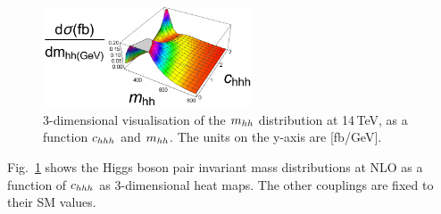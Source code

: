 \begin{figure}[ht]
\begin{center}
  \includegraphics[width=0.55\textwidth]{plots/3D_mhh_chhh.pdf}    
\end{center}
\caption{3-dimensional visualisation of the $m_{hh}$ distribution at
  14\,TeV, as a function  $c_{hhh}$ and $m_{hh}$. The units on the y-axis are [fb/GeV].}
\label{fig:chhh_3D}
\end{figure}
Fig.~\ref{fig:chhh_3D} shows the Higgs boson pair invariant mass
distributions at NLO as a function of $c_{hhh}$  as 3-dimensional heat maps.
The other couplings are fixed to their SM values.
 
%


